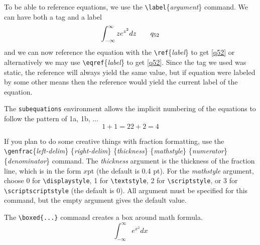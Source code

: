 \documentclass{amsart}
\begin{document}
	To be able to reference equations, we use the 
	\verb+\label+\{\emph{argument}\} command. 
	We can have both a tag and a label
	\begin{equation} \label{q52}
		\int_{-\infty}^{\infty} ze^{z^2} dz \tag*{$q_{52}$}
	\end{equation}
	and we can now reference the equation with the 
	\verb+\ref+\{\emph{label}\} to get \ref{q52} or alternatively
	we may use \verb+\eqref+\{\emph{label}\} to get \eqref{q52}. 
	Since the tag we used was static, the reference will always yield 
	the same value, but if equation were labeled by some other means
	then the reference would yield the current label of the equation. 

	The \verb+subequations+ environment allows the implicit numbering
	of the equations to follow the pattern of 1a, 1b, ...
	\begin{subequations}
		\begin{equation}
			1 + 1 = 2
		\end{equation}
		\begin{equation}
			2 + 2 = 4
		\end{equation}
	\end{subequations}

	If you plan to do some creative things with fraction formatting,
	use the \\
	\verb+\genfrac+\{\emph{left-delim}\}
		\negthickspace\{\emph{right-delim}\}
		\negthickspace\{\emph{thickness}\}
		\negthickspace\{\emph{mathstyle}\}
		\negthickspace\{\emph{numerator}\}
		\negthickspace\{\emph{denominator}\}
	command. 
	The \emph{thickness} argument is the thickness of the fraction line, 
	which is in the form $x$pt (the default is 0.4 pt). 
	For the \emph{mathstyle} argument, choose 0 for \verb+\displaystyle+, 
	1 for \verb+\textstyle+, 2 for \verb+\scriptstyle+, or 3 for
	\verb+\scriptscriptstyle+ (the default is 0). 
	All argument must be specified for this command, but the empty
	argument gives the default value. 

	The \verb+\boxed{...}+ command creates a box around math formula.
	\begin{equation}
		\boxed{\int_{-\infty}^{\infty} e^{x^2} dx}
	\end{equation}
\end{document}
